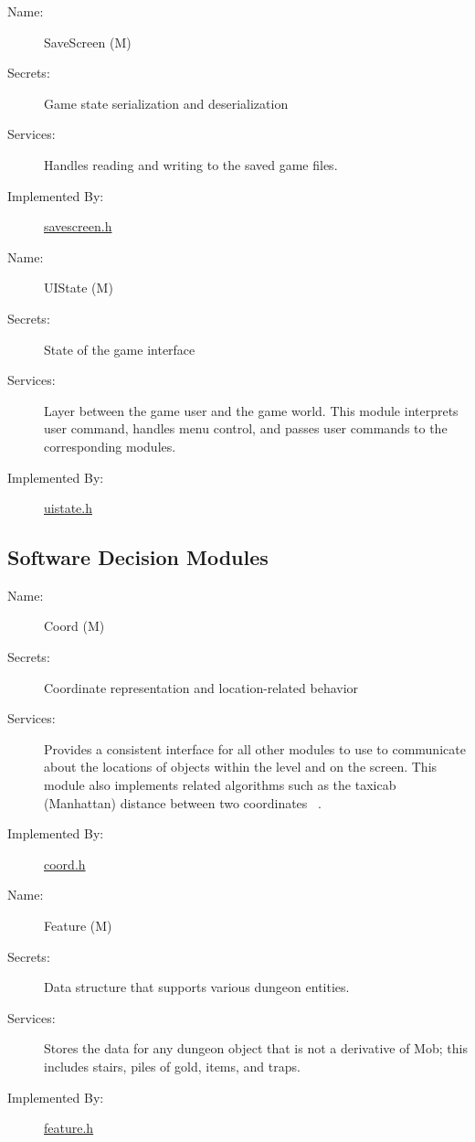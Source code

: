 \documentclass[12pt, titlepage]{article}
\newcommand{\rev}[1]{\textcolor{RevisionColour}{#1}}
\newcounter{mnum}
\newcommand{\mdprint}[1]{\addtocounter{mnum}{1} #1 (M\themnum)}
\begin{document}
        \bigskip\begin{description}
            \item[\rev{Name:}]\mdprint{\rev{SaveScreen}}
            \item[\rev{Secrets:}]\rev{Game state serialization and deserialization}
            \item[\rev{Services:}]\rev{Handles reading and writing to the saved game files.}
            \item[\rev{Implemented By:}]\href{run:../../../src/include/savescreen.h}{savescreen.h}
        \end{description}

        \bigskip\begin{description}
            \item[Name:]\mdprint{UIState}
            \item[Secrets:]State of the game interface
            \item[Services:]Layer between the game user and the game world.   This module interprets user command, handles menu control, and passes user commands to the corresponding modules.
            \item[Implemented By:]\href{run:../../../src/include/uistate.h}{uistate.h}
        \end{description}

    \subsection{Software Decision Modules}

        \bigskip\begin{description}
            \item[Name:]\mdprint{Coord}
            \item[Secrets:]Coordinate representation and location-related behavior
            \item[Services:]Provides a consistent interface for all other modules to use to communicate about the locations of objects within the level and on the screen.  This module also implements related algorithms such as the taxicab (Manhattan) distance between two coordinates ~\citep{Taxicab}.
            \item[Implemented By:]\href{run:../../../src/include/uistate.h}{coord.h}
        \end{description}

        \bigskip\begin{description}
            \item[Name:]\mdprint{Feature}
            \item[Secrets:]Data structure that supports various dungeon entities.
            \item[Services:]Stores the data for any dungeon object that is not a derivative of Mob; this includes stairs, piles of gold, items, and traps.
            \item[Implemented By:]\href{run:../../../src/include/feature.h}{feature.h}
        \end{description}
\end{document}
